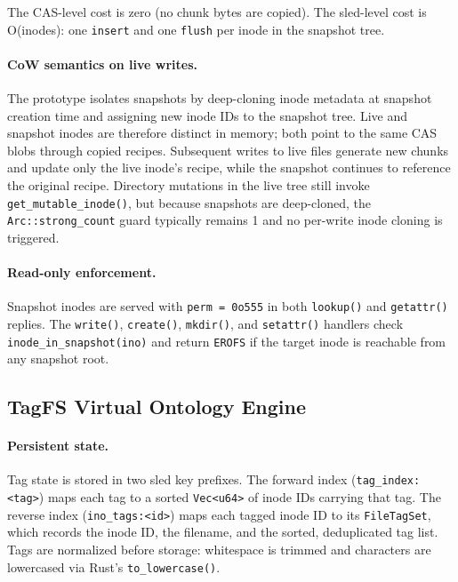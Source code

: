 \documentclass[journal]{IEEEtran}
\begin{document}
The CAS-level cost is zero (no chunk bytes are copied).  The
sled-level cost is O(inodes): one \texttt{insert} and one \texttt{flush}
per inode in the snapshot tree.

\paragraph{CoW semantics on live writes.}
The prototype isolates snapshots by deep-cloning inode metadata at
snapshot creation time and assigning new inode IDs to the snapshot tree.
Live and snapshot inodes are therefore distinct in memory; both point to
the same CAS blobs through copied recipes.  Subsequent writes to live
files generate new chunks and update only the live inode's recipe, while
the snapshot continues to reference the original recipe.  Directory
mutations in the live tree still invoke \texttt{get\_mutable\_inode()},
but because snapshots are deep-cloned, the \texttt{Arc::strong\_count}
guard typically remains 1 and no per-write inode cloning is triggered.

\paragraph{Read-only enforcement.}
Snapshot inodes are served with \texttt{perm = 0o555} in both
\texttt{lookup()} and \texttt{getattr()} replies.  The \texttt{write()},
\texttt{create()}, \texttt{mkdir()}, and \texttt{setattr()} handlers
check \texttt{inode\_in\_snapshot(ino)} and return \texttt{EROFS}
if the target inode is reachable from any snapshot root.

\subsection{TagFS Virtual Ontology Engine}
\label{sec:tagfs}

\paragraph{Persistent state.}
Tag state is stored in two sled key prefixes.  The forward index
(\texttt{tag\_index:\textless{}tag\textgreater{}}) maps each tag to a
sorted \texttt{Vec\textless{}u64\textgreater{}} of inode IDs carrying
that tag.  The reverse index (\texttt{ino\_tags:\textless{}id\textgreater{}})
maps each tagged inode ID to its \texttt{FileTagSet}, which records the
inode ID, the filename, and the sorted, deduplicated tag list.  Tags are
normalized before storage: whitespace is trimmed and characters are
lowercased via Rust's \texttt{to\_lowercase()}.
\end{document}
